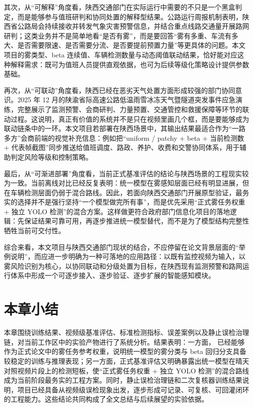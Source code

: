 其次，从“可解释”角度看，陕西交通部门在实际运行中需要的不只是一个黑盒判定，而是能够参与值班研判和协同处置的解释型结果。公路运行周报机制表明，陕西省公路局会持续接收并转发气象灾害预警信息，并结合重点线路交通量开展路网研判；这类业务并不是简单地看“是否有雾”，而是要回答“雾有多重、车流有多大、是否需要限速、是否需要分流、是否要提前预置力量”等更具体的问题\cite{shaanxiWeekly2025,shaanxiWhitepaper2024}。本文项目的雾类型、beta 连续值、车辆检测数量与动态阈值联动结果，恰好能对应这种解释需求：既可为值班人员提供直观依据，也可为后续等级化策略设计提供参数基础。

再次，从“可联动”角度看，陕西已经在恶劣天气处置方面形成较强的部门协同意识。2025 年 12 月的陕渝省际高速公路低温雨雪冰冻天气暨隧道突发事件应急演练，完整展示了监测预警、会商研判、力量预置、交通管控和救援保障等环节的联动过程\cite{shaanxiEmergency2025}。这说明，真正有价值的系统并不是只在视频里画几个框，而是要能够成为联动链条中的一环。本文项目若部署在陕西场景中，其输出结果最适合作为“一路多方”会商前端的视觉补充信息：例如把“uniform / patchy + beta + 当前检测数 + 代表帧截图”同步推送给值班调度、路政、养护、收费和交警协同体系，用于辅助判定风险等级和控制策略。

最后，从“可渐进部署”角度看，当前正式基准评估的结论与陕西场景的工程现实较为一致。当前离线对比已经反复表明：统一模型在雾感知层面已经有明显进展，但在车辆检测层面仍弱于混合路线。因此，若面向陕西交通部门开展原型验证，最务实的选择并不是强行坚持“一个模型做完所有事”，而是优先采用“正式雾任务权重 + 独立 YOLO 检测”的混合方案。这样做更符合政府部门信息化项目的落地逻辑：先保证结果可靠可用，再逐步推进统一模型替代，而不是为了模型结构完整性牺牲当前可交付性。

综合来看，本文项目与陕西交通部门现状的结合，不应停留在论文背景层面的“举例说明”，而应进一步明确为一种可落地的应用路径：以既有监控视频为输入，以雾风险识别为核心，以协同联动和分级处置为目标，在陕西现有监测预警和路网运行体系中形成一个可逐步接入、逐步验证、逐步扩展的智能感知模块。

\section{本章小结}

本章围绕训练结果、视频级基准评估、标准检测指标、误差案例以及静止误检治理链，对当前工作区中的实验产物进行了系统分析。结果表明：一方面， 已经能够作为正式论文中的雾任务参考权重，说明统一模型的雾分类与 beta 回归分支具备较稳定的训练与推理表现；另一方面，正式基准评估又明确暴露出统一模型在晴天对照视频片段上的检测短板，使“正式雾任务权重 + 独立 YOLO 检测”的混合路线成为当前阶段最务实的工程方案。同时，静止误检治理链和二次复核器训练结果说明，项目已经具备从视频级误检现象出发，逐步形成可记录、可复核、可回灌闭环的工程能力。这些结论共同构成了全文总结与后续展望的实验依据。
